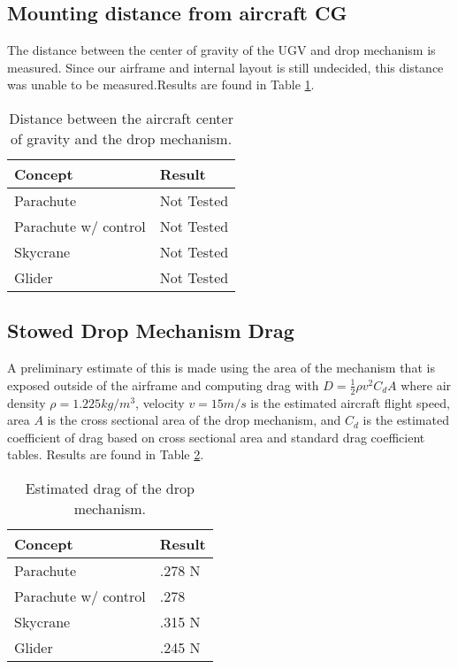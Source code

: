 \documentclass[]{auvsi_doc}
\begin{document}
	\subsection{Mounting distance from aircraft CG}

	The distance between the center of gravity of the UGV and drop mechanism is measured. Since our airframe and internal layout is still undecided, this distance was unable to be measured.Results are found in Table \ref{cg}.

	\begin{table}[!h]
\centering

\caption{Distance between the aircraft center of gravity and the drop mechanism.}
\label{cg}
	\begin{tabular}{|l|l|}
		\hline
		\textbf{Concept}       & \textbf{Result} \\
		\hline
		Parachute              &      Not Tested           \\
		Parachute w/ control   &           Not Tested      \\
		Skycrane               &     Not Tested            \\
		Glider                 &		Not Tested		 \\
		\hline
	\end{tabular}
\end{table}

	\subsection{Stowed Drop Mechanism Drag}                                   


	A preliminary estimate of this is made using the area of the mechanism that is exposed outside of the airframe and computing drag with $D = \frac{1}{2}\rho v^2 C_d A$ where air density $\rho = 1.225 kg/m^3$, velocity $v = 15 m/s$ is the estimated aircraft flight speed, area $A$ is the cross sectional area of the drop mechanism, and $C_d$ is the estimated coefficient of drag based on cross sectional area and standard drag coefficient tables. Results are found in Table \ref{drag}.
	

	\begin{table}[!h]
	\centering

	\caption{Estimated drag of the drop mechanism.}
\label{drag}
	\begin{tabular}{|l|l|}
		\hline
		\textbf{Concept}       & \textbf{Result} \\
		\hline
		Parachute              &         .278 N        \\
		Parachute w/ control   &    .278             \\
		Skycrane               &        .315 N         \\
		Glider                 &		.245 N		 \\
		\hline
	\end{tabular}
	\end{table}
\end{document}
